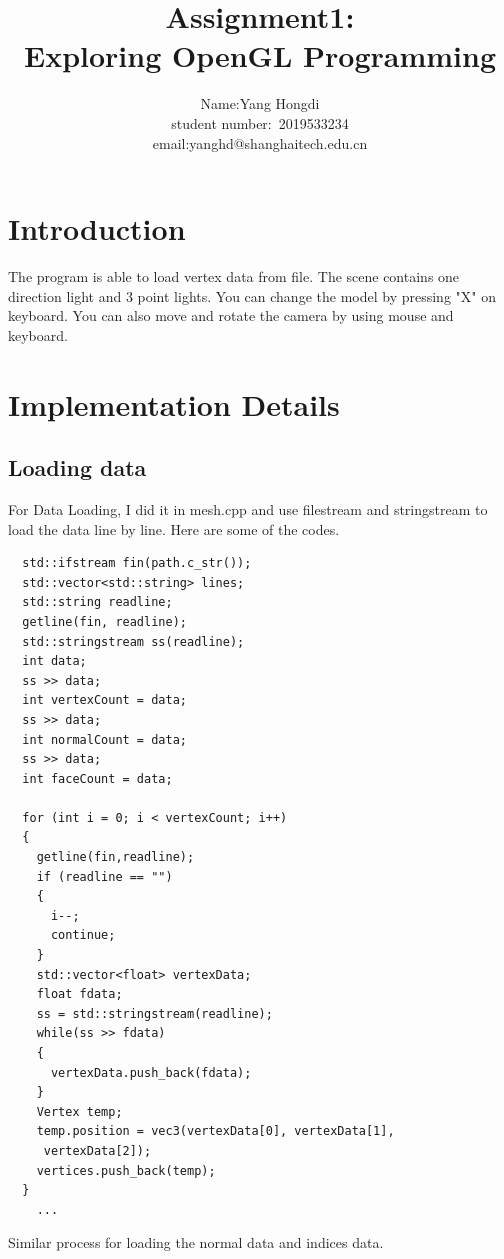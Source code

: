 \documentclass[acmtog]{acmart}
\title{Assignment1:\\ {Exploring OpenGL Programming}}
\author{Name:\quad Yang Hongdi \\ student number:\ 2019533234
\\email:\quad yanghd@shanghaitech.edu.cn}
\begin{document}
\maketitle

\vspace*{2 ex}

\section{Introduction}
\quad The program is able to load vertex data from file. The scene contains one direction light and 3 point lights. You can change the model by pressing "X" on keyboard.
You can also move and rotate the camera by using mouse and keyboard.
\section{Implementation Details}
\subsection{Loading data}
\quad For Data Loading, I did it in mesh.cpp and use filestream and stringstream to load the data line by line.
Here are some of the codes.\\
	\begin{lstlisting}
  std::ifstream fin(path.c_str());
  std::vector<std::string> lines;
  std::string readline;
  getline(fin, readline);
  std::stringstream ss(readline);
  int data;
  ss >> data;
  int vertexCount = data;
  ss >> data;
  int normalCount = data;
  ss >> data;
  int faceCount = data;

  for (int i = 0; i < vertexCount; i++)
  {
    getline(fin,readline);
    if (readline == "")
    {
      i--;
      continue;
    }
    std::vector<float> vertexData;
    float fdata;
    ss = std::stringstream(readline);
    while(ss >> fdata)
    {
      vertexData.push_back(fdata);
    }
    Vertex temp;
    temp.position = vec3(vertexData[0], vertexData[1],
	 vertexData[2]);
    vertices.push_back(temp);
  }
	...
	\end{lstlisting}
	Similar process for loading the normal data and indices data.
\end{document}
